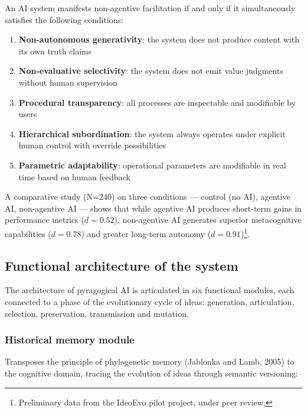 \begin{definition}
	An AI system manifests non-agentive facilitation if and only if it simultaneously satisfies the following conditions:
	\begin{enumerate}
		\item \textbf{Non-autonomous generativity}: the system does not produce content with its own truth claims
		\item \textbf{Non-evaluative selectivity}: the system does not emit value judgments without human supervision
		\item \textbf{Procedural transparency}: all processes are inspectable and modifiable by users
		\item \textbf{Hierarchical subordination}: the system always operates under explicit human control with override possibilities
		\item \textbf{Parametric adaptability}: operational parameters are modifiable in real time based on human feedback
	\end{enumerate}
\end{definition}

A comparative study (N=240) on three conditions — control (no AI), agentive AI, non-agentive AI — shows that while agentive AI produces short-term gains in performance metrics ($d = 0.52$), non-agentive AI generates superior metacognitive capabilities ($d = 0.78$) and greater long-term autonomy ($d = 0.91$)\footnote{Preliminary data from the IdeoEvo pilot project, under peer review.}.

\subsection{Functional architecture of the system}
\label{subsec:functional-architecture}

The architecture of pyragogical AI is articulated in six functional modules, each connected to a phase of the evolutionary cycle of ideas: generation, articulation, selection, preservation, transmission and mutation.

\subsubsection{Historical memory module}

Transposes the principle of phylogenetic memory (Jablonka and Lamb, 2005) to the cognitive domain, tracing the evolution of ideas through semantic versioning:

